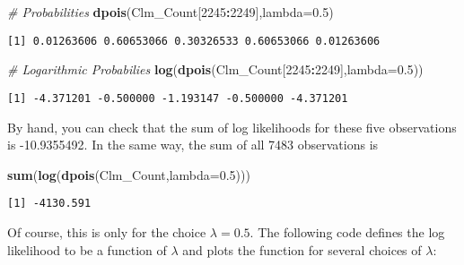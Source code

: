 \documentclass[]{book}
\newenvironment{Shaded}{\begin{snugshade}}{\end{snugshade}}
\newcommand{\KeywordTok}[1]{\textcolor[rgb]{0.13,0.29,0.53}{\textbf{#1}}}
\newcommand{\DataTypeTok}[1]{\textcolor[rgb]{0.13,0.29,0.53}{#1}}
\newcommand{\DecValTok}[1]{\textcolor[rgb]{0.00,0.00,0.81}{#1}}
\newcommand{\FloatTok}[1]{\textcolor[rgb]{0.00,0.00,0.81}{#1}}
\newcommand{\CommentTok}[1]{\textcolor[rgb]{0.56,0.35,0.01}{\textit{#1}}}
\newcommand{\OperatorTok}[1]{\textcolor[rgb]{0.81,0.36,0.00}{\textbf{#1}}}
\newcommand{\NormalTok}[1]{#1}
\theoremstyle{definition}
\theoremstyle{definition}
\theoremstyle{definition}
\theoremstyle{remark}
\begin{document}
\begin{Shaded}
\begin{Highlighting}[]
\CommentTok{# Probabilities}
\KeywordTok{dpois}\NormalTok{(Clm_Count[}\DecValTok{2245}\OperatorTok{:}\DecValTok{2249}\NormalTok{],}\DataTypeTok{lambda=}\FloatTok{0.5}\NormalTok{)}
\end{Highlighting}
\end{Shaded}

\begin{verbatim}
[1] 0.01263606 0.60653066 0.30326533 0.60653066 0.01263606
\end{verbatim}

\begin{Shaded}
\begin{Highlighting}[]
\CommentTok{# Logarithmic Probabilies}
\KeywordTok{log}\NormalTok{(}\KeywordTok{dpois}\NormalTok{(Clm_Count[}\DecValTok{2245}\OperatorTok{:}\DecValTok{2249}\NormalTok{],}\DataTypeTok{lambda=}\FloatTok{0.5}\NormalTok{))}
\end{Highlighting}
\end{Shaded}

\begin{verbatim}
[1] -4.371201 -0.500000 -1.193147 -0.500000 -4.371201
\end{verbatim}

By hand, you can check that the sum of log likelihoods for these five
observations is -10.9355492. In the same way, the sum of all 7483
observations is

\begin{Shaded}
\begin{Highlighting}[]
\KeywordTok{sum}\NormalTok{(}\KeywordTok{log}\NormalTok{(}\KeywordTok{dpois}\NormalTok{(Clm_Count,}\DataTypeTok{lambda=}\FloatTok{0.5}\NormalTok{)))}
\end{Highlighting}
\end{Shaded}

\begin{verbatim}
[1] -4130.591
\end{verbatim}

Of course, this is only for the choice \(\lambda = 0.5\). The following
code defines the log likelihood to be a function of \(\lambda\) and
plots the function for several choices of \(\lambda\):
\end{document}
